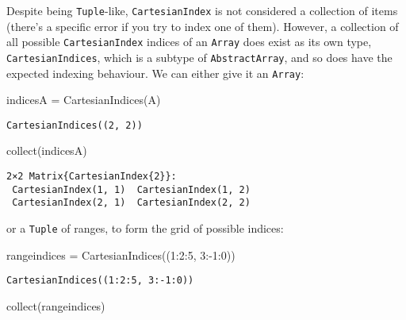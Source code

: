 \documentclass[
  letterpaper,
  DIV=11,
  numbers=noendperiod]{scrreprt}
\newenvironment{Shaded}{\begin{snugshade}}{\end{snugshade}}
\newcommand{\FloatTok}[1]{\textcolor[rgb]{0.68,0.00,0.00}{#1}}
\newcommand{\FunctionTok}[1]{\textcolor[rgb]{0.28,0.35,0.67}{#1}}
\newcommand{\NormalTok}[1]{\textcolor[rgb]{0.00,0.23,0.31}{#1}}
\newcommand{\OperatorTok}[1]{\textcolor[rgb]{0.37,0.37,0.37}{#1}}
\begin{document}
Despite being \texttt{Tuple}-like, \texttt{CartesianIndex} is not
considered a collection of items (there's a specific error if you try to
index one of them). However, a collection of all possible
\texttt{CartesianIndex} indices of an \texttt{Array} does exist as its
own type, \texttt{CartesianIndices}, which is a subtype of
\texttt{AbstractArray}, and so does have the expected indexing
behaviour. We can either give it an \texttt{Array}:

\begin{Shaded}
\begin{Highlighting}[]
\NormalTok{indicesA }\OperatorTok{=} \FunctionTok{CartesianIndices}\NormalTok{(A)}
\end{Highlighting}
\end{Shaded}

\begin{verbatim}
CartesianIndices((2, 2))
\end{verbatim}

\begin{Shaded}
\begin{Highlighting}[]
\FunctionTok{collect}\NormalTok{(indicesA)}
\end{Highlighting}
\end{Shaded}

\begin{verbatim}
2×2 Matrix{CartesianIndex{2}}:
 CartesianIndex(1, 1)  CartesianIndex(1, 2)
 CartesianIndex(2, 1)  CartesianIndex(2, 2)
\end{verbatim}

or a \texttt{Tuple} of ranges, to form the grid of possible indices:

\begin{Shaded}
\begin{Highlighting}[]
\NormalTok{rangeindices }\OperatorTok{=} \FunctionTok{CartesianIndices}\NormalTok{((}\FloatTok{1}\OperatorTok{:}\FloatTok{2}\OperatorTok{:}\FloatTok{5}\NormalTok{, }\FloatTok{3}\OperatorTok{:{-}}\FloatTok{1}\OperatorTok{:}\FloatTok{0}\NormalTok{))}
\end{Highlighting}
\end{Shaded}

\begin{verbatim}
CartesianIndices((1:2:5, 3:-1:0))
\end{verbatim}

\begin{Shaded}
\begin{Highlighting}[]
\FunctionTok{collect}\NormalTok{(rangeindices)}
\end{Highlighting}
\end{Shaded}
\end{document}
